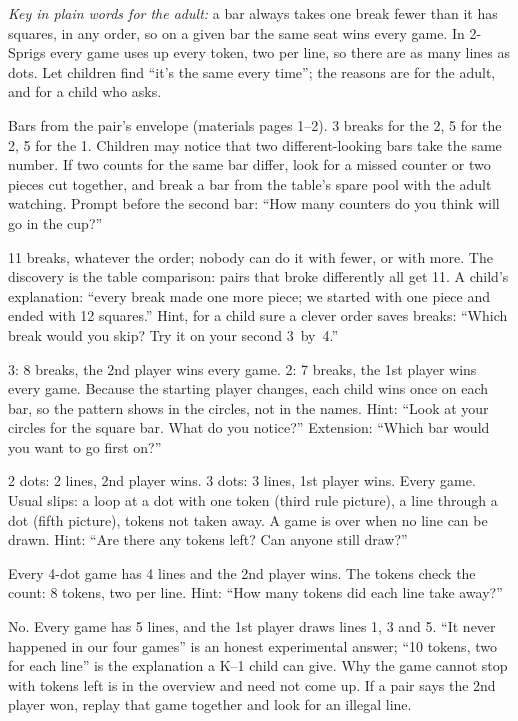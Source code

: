 \emph{Key in plain words for the adult:} a bar always takes one break fewer than it has squares, in any order, so on a given bar the same seat wins every game. In 2-Sprigs every game uses up every token, two per line, so there are as many lines as dots. Let children find ``it's the same every time''; the reasons are for the adult, and for a child who asks.

Bars from the pair's envelope (materials pages 1--2). 3 breaks for the 2, 5 for the 2, 5 for the 1. Children may notice that two different-looking bars take the same number. If two counts for the same bar differ, look for a missed counter or two pieces cut together, and break a bar from the table's spare pool with the adult watching. Prompt before the second bar: ``How many counters do you think will go in the cup?''

11 breaks, whatever the order; nobody can do it with fewer, or with more. The discovery is the table comparison: pairs that broke differently all get 11. A child's explanation: ``every break made one more piece; we started with one piece and ended with 12 squares.'' Hint, for a child sure a clever order saves breaks: ``Which break would you skip? Try it on your second 3~by~4.''

3: 8 breaks, the 2nd player wins every game. 2: 7 breaks, the 1st player wins every game. Because the starting player changes, each child wins once on each bar, so the pattern shows in the circles, not in the names. Hint: ``Look at your circles for the square bar. What do you notice?'' Extension: ``Which bar would you want to go first on?''

2 dots: 2 lines, 2nd player wins. 3 dots: 3 lines, 1st player wins. Every game. Usual slips: a loop at a dot with one token (third rule picture), a line through a dot (fifth picture), tokens not taken away. A game is over when no line can be drawn. Hint: ``Are there any tokens left? Can anyone still draw?''

Every 4-dot game has 4 lines and the 2nd player wins. The tokens check the count: 8 tokens, two per line. Hint: ``How many tokens did each line take away?''

No. Every game has 5 lines, and the 1st player draws lines 1, 3 and 5. ``It never happened in our four games'' is an honest experimental answer; ``10 tokens, two for each line'' is the explanation a K--1 child can give. Why the game cannot stop with tokens left is in the overview and need not come up. If a pair says the 2nd player won, replay that game together and look for an illegal line.

